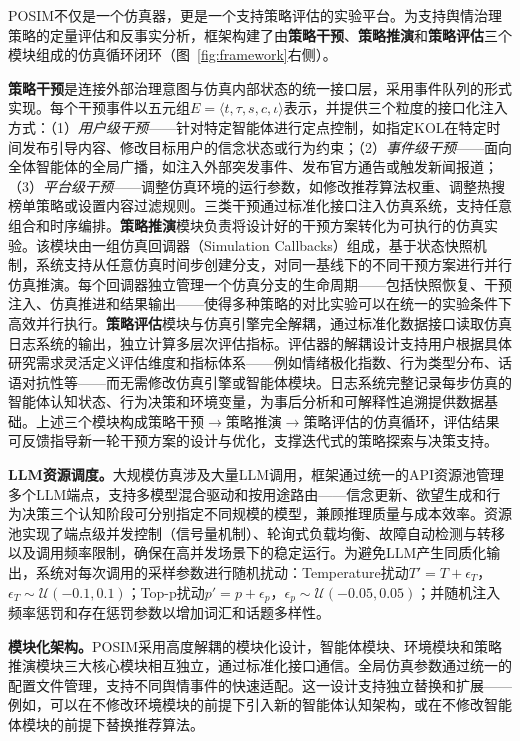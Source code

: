 \documentclass[lettersize,journal]{IEEEtran}
\begin{document}
POSIM不仅是一个仿真器，更是一个支持策略评估的实验平台。为支持舆情治理策略的定量评估和反事实分析，框架构建了由\textbf{策略干预}、\textbf{策略推演}和\textbf{策略评估}三个模块组成的仿真循环闭环（图~\ref{fig:framework}右侧）。

\textbf{策略干预}是连接外部治理意图与仿真内部状态的统一接口层，采用事件队列的形式实现。每个干预事件以五元组$E = \langle t, \tau, s, c, \iota \rangle$表示，并提供三个粒度的接口化注入方式：（1）\textit{用户级干预}——针对特定智能体进行定点控制，如指定KOL在特定时间发布引导内容、修改目标用户的信念状态或行为约束；（2）\textit{事件级干预}——面向全体智能体的全局广播，如注入外部突发事件、发布官方通告或触发新闻报道；（3）\textit{平台级干预}——调整仿真环境的运行参数，如修改推荐算法权重、调整热搜榜单策略或设置内容过滤规则。三类干预通过标准化接口注入仿真系统，支持任意组合和时序编排。\textbf{策略推演}模块负责将设计好的干预方案转化为可执行的仿真实验。该模块由一组仿真回调器（Simulation Callbacks）组成，基于状态快照机制，系统支持从任意仿真时间步创建分支，对同一基线下的不同干预方案进行并行仿真推演。每个回调器独立管理一个仿真分支的生命周期——包括快照恢复、干预注入、仿真推进和结果输出——使得多种策略的对比实验可以在统一的实验条件下高效并行执行。\textbf{策略评估}模块与仿真引擎完全解耦，通过标准化数据接口读取仿真日志系统的输出，独立计算多层次评估指标。评估器的解耦设计支持用户根据具体研究需求灵活定义评估维度和指标体系——例如情绪极化指数、行为类型分布、话语对抗性等——而无需修改仿真引擎或智能体模块。日志系统完整记录每步仿真的智能体认知状态、行为决策和环境变量，为事后分析和可解释性追溯提供数据基础。上述三个模块构成策略干预$\to$策略推演$\to$策略评估的仿真循环，评估结果可反馈指导新一轮干预方案的设计与优化，支撑迭代式的策略探索与决策支持。

\textbf{LLM资源调度。}大规模仿真涉及大量LLM调用，框架通过统一的API资源池管理多个LLM端点，支持多模型混合驱动和按用途路由——信念更新、欲望生成和行为决策三个认知阶段可分别指定不同规模的模型，兼顾推理质量与成本效率。资源池实现了端点级并发控制（信号量机制）、轮询式负载均衡、故障自动检测与转移以及调用频率限制，确保在高并发场景下的稳定运行。为避免LLM产生同质化输出，系统对每次调用的采样参数进行随机扰动：Temperature扰动$T' = T + \epsilon_T$，$\epsilon_T \sim \mathcal{U}(-0.1, 0.1)$；Top-p扰动$p' = p + \epsilon_p$，$\epsilon_p \sim \mathcal{U}(-0.05, 0.05)$；并随机注入频率惩罚和存在惩罚参数以增加词汇和话题多样性。

\textbf{模块化架构。}POSIM采用高度解耦的模块化设计，智能体模块、环境模块和策略推演模块三大核心模块相互独立，通过标准化接口通信。全局仿真参数通过统一的配置文件管理，支持不同舆情事件的快速适配。这一设计支持独立替换和扩展——例如，可以在不修改环境模块的前提下引入新的智能体认知架构，或在不修改智能体模块的前提下替换推荐算法。
\end{document}
